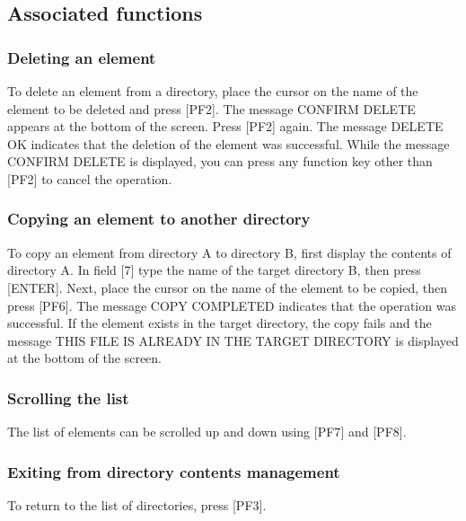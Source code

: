 \documentclass[letterpaper,10pt,english]{sphinxmanual}
\begin{document}
 


\subsection{Associated functions}
\label{\detokenize{User_Guide:associated-functions}}

\subsubsection{Deleting an element}
\label{\detokenize{User_Guide:deleting-an-element}}
To delete an element from a directory, place the cursor on the name of the element to be deleted and press {[}PF2{]}. The message CONFIRM DELETE appears at the bottom of the screen. Press {[}PF2{]} again. The message DELETE OK indicates that the deletion of the element was successful. While the message CONFIRM DELETE is displayed, you can press any function key other than {[}PF2{]} to cancel the operation.


\subsubsection{Copying an element to another directory}
\label{\detokenize{User_Guide:copying-an-element-to-another-directory}}
To copy an element from directory A to directory B, first display the contents of directory A. In field {[}7{]} type the name of the target directory B, then press {[}ENTER{]}. Next, place the cursor on the name of the element to be copied, then press {[}PF6{]}. The message COPY COMPLETED indicates that the operation was successful. If the element exists in the target directory, the copy fails and the message THIS FILE IS ALREADY IN THE TARGET DIRECTORY is displayed at the bottom of the screen.


\subsubsection{Scrolling the list}
\label{\detokenize{User_Guide:scrolling-the-list}}
The list of elements can be scrolled up and down using {[}PF7{]} and {[}PF8{]}.


\subsubsection{Exiting from directory contents management}
\label{\detokenize{User_Guide:exiting-from-directory-contents-management}}
To return to the list of directories, press {[}PF3{]}.
\end{document}
